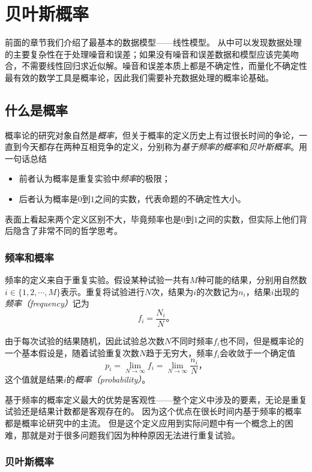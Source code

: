 \chapter{贝叶斯概率}

前面的章节我们介绍了最基本的数据模型——线性模型。
从中可以发现数据处理的主要复杂性在于处理噪音和误差；如果没有噪音和误差数据和模型应该完美吻合，不需要线性回归求近似解。噪音和误差本质上都是不确定性，而量化不确定性最有效的数学工具是概率论，因此我们需要补充数据处理的概率论基础。

\section{什么是概率}
概率论的研究对象自然是\emph{概率}，但关于概率的定义历史上有过很长时间的争论，一直到今天都存在两种互相竞争的定义，分别称为\emph{基于频率的概率}和\emph{贝叶斯概率}。用一句话总结
\begin{itemize}
    \item 前者认为概率是重复实验中\emph{频率}的极限；
    \item 后者认为概率是$0$到$1$之间的实数，代表命题的不确定性大小。
\end{itemize}
表面上看起来两个定义区别不大，毕竟频率也是$0$到$1$之间的实数，但实际上他们背后隐含了非常不同的哲学思考。

\subsection{频率和概率}

频率的定义来自于重复实验。假设某种试验一共有$M$种可能的结果，分别用自然数$i\in\{1,2,\cdots, M\}$表示。重复将试验进行$N$次，结果为$i$的次数记为$n_i$，结果$i$出现的\emph{频率（frequency）}记为
\begin{equation}
    f_i=\frac{N_i}{N}。
\end{equation}

由于每次试验的结果随机，因此试验总次数$N$不同时频率$f_i$也不同，但是概率论的一个基本假设是，随着试验重复次数$N$趋于无穷大，频率$f_i$会收敛于一个确定值
\begin{equation}
    p_i=\lim_{N\to\infty}f_i=\lim_{N\to\infty}\frac{n_i}{N}，
\end{equation}
这个值就是结果$i$的\emph{概率（probability）}。

基于频率的概率定义最大的优势是客观性——整个定义中涉及的要素，无论是重复试验还是结果计数都是客观存在的。
因为这个优点在很长时间内基于频率的概率都是概率论研究中的主流。
但是这个定义应用到实际问题中有一个概念上的困难，那就是对于很多问题我们因为种种原因无法进行重复试验。

\subsection{贝叶斯概率}
